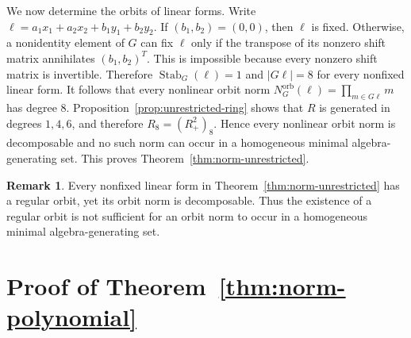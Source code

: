 \documentclass[11pt]{article}
\theoremstyle{definition}
\newtheorem{remark}[theorem]{Remark}
\begin{document}
We now determine the orbits of linear forms.  Write $\ell=a_1x_1+a_2x_2+b_1y_1+b_2y_2$. If $(b_1,b_2)=(0,0)$, then $\ell$ is fixed.  Otherwise, a nonidentity element of $G$ can fix $\ell$ only if the transpose of its nonzero shift matrix annihilates $(b_1,b_2)^T$.  This is impossible because every nonzero shift matrix is invertible.  Therefore $\operatorname{Stab}_G(\ell)=1$ and $|G\ell|=8$ for every nonfixed linear form. It follows that every nonlinear orbit norm $N_G^{\mathrm{orb}}(\ell)=\prod_{m\in G\ell}m$ has degree $8$.  Proposition~\ref{prop:unrestricted-ring} shows that $R$ is generated in degrees $1,4,6$, and therefore $R_8=(R_+^2)_8$.  Hence every nonlinear orbit norm is decomposable and no such norm can occur in a homogeneous minimal algebra-generating set. This proves Theorem~\ref{thm:norm-unrestricted}.

\begin{remark}
	Every nonfixed linear form in Theorem~\ref{thm:norm-unrestricted} has a regular orbit, yet its orbit norm is decomposable. Thus the existence of a regular orbit is not sufficient for an orbit norm to occur in a homogeneous minimal algebra-generating set.
\end{remark}

\section{Proof of Theorem~\ref{thm:norm-polynomial}}
\label{sec:polynomial-norm}
\end{document}
